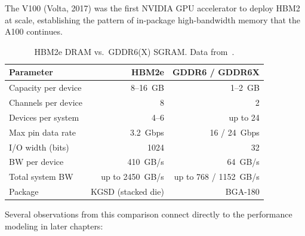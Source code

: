The V100 (Volta, 2017) was the first NVIDIA GPU accelerator to deploy HBM2
at scale, establishing the pattern of in-package high-bandwidth memory that
the A100 continues.

\begin{table}[H]
\centering
\caption{HBM2e DRAM vs.\ GDDR6(X) SGRAM.
  Data from~\cite{micron2021hbm2e}.}
\label{tab:hbm-vs-gddr}
\begin{tabularx}{\textwidth}{l r r}
\toprule
Parameter & HBM2e & GDDR6 / GDDR6X \\
\midrule
Capacity per device    & 8--\SI{16}{GB}       & 1--\SI{2}{GB} \\
Channels per device    & 8                     & 2 \\
Devices per system     & 4--6                  & up to 24 \\
Max pin data rate      & \SI{3.2}{Gbps}        & 16 / \SI{24}{Gbps} \\
I/O width (bits)       & 1024                  & 32 \\
BW per device          & \SI{410}{GB/s}        & \SI{64}{GB/s} \\
Total system BW        & up to \SI{2450}{GB/s} & up to 768 / \SI{1152}{GB/s} \\
Package                & KGSD (stacked die)    & BGA-180 \\
\bottomrule
\end{tabularx}
\end{table}

Several observations from this comparison connect directly to the performance
modeling in later chapters:

